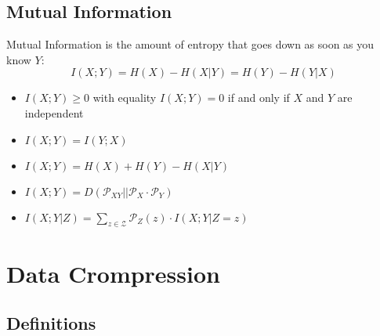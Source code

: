 \documentclass[a4paper]{article}
\begin{document}
\begin{twocolumn}
\subsection{Mutual Information}
Mutual Information is the amount of entropy that goes down as soon as you know $Y$:
\[I(X;Y) = H(X) - H(X|Y) = H(Y) - H(Y|X)\]

\begin{itemize}
    \item $I(X;Y) \geq 0$ with equality $I(X;Y) = 0$ if and only if $X$ and $Y$ are independent
    \item $I(X;Y) = I(Y;X)$
    \item $I(X;Y) = H(X) + H(Y) - H(X|Y)$
    \item $I(X;Y) = D(\mathcal{P}_{XY}||\mathcal{P}_X \cdot \mathcal{P}_Y)$
    \item $I(X;Y|Z) = \sum_{z \in \mathcal{Z}} \mathcal{P}_Z(z) \cdot I(X;Y|Z=z)$
\end{itemize}

\section{Data Crompression}

\subsection{Definitions}


\end{twocolumn}
\end{document}
